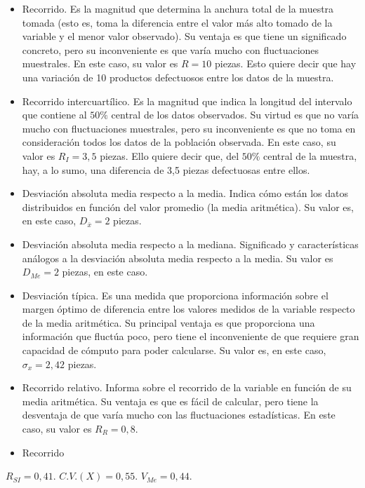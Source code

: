 \begin{itemize}
	
	\item Recorrido. Es la magnitud que determina la anchura total de la muestra tomada (esto es, toma la diferencia entre el valor más alto tomado de la variable y el menor valor observado). Su ventaja es que tiene un significado concreto, pero su inconveniente es que varía mucho con fluctuaciones muestrales. En este caso, su valor es $R = 10$ piezas. Esto quiere decir que hay una variación de 10 productos defectuosos entre los datos de la muestra.
	
	\item Recorrido intercuartílico. Es la magnitud que indica la longitud del intervalo que contiene al $50\%$ central de los datos observados. Su virtud es que no varía mucho con fluctuaciones muestrales, pero su inconveniente es que no toma en consideración todos los datos de la población observada. En este caso, su valor es $R_{I} = 3,5$ piezas. Ello quiere decir que, del $50\%$ central de la muestra, hay, a lo sumo, una diferencia de 3,5 piezas defectuosas entre ellos.
	
	\item Desviación absoluta media respecto a la media. Indica cómo están los datos distribuidos en función del valor promedio (la media aritmética). Su valor es, en este caso, $D_{\bar x} = 2$ piezas.
	
	\item Desviación absoluta media respecto a la mediana. Significado y características análogos a la desviación absoluta media respecto a la media. Su valor es $D_{Me} = 2$ piezas, en este caso.
	
	\item Desviación típica. Es una medida que proporciona información sobre el margen óptimo de diferencia entre los valores medidos de la variable respecto de la media aritmética. Su principal ventaja es que proporciona una información que fluctúa poco, pero tiene el inconveniente de que requiere gran capacidad de cómputo para poder calcularse. Su valor es, en este caso, $\sigma_{x} = 2,42$ piezas.
	
	\item Recorrido relativo. Informa sobre el recorrido de la variable en función de su media aritmética. Su ventaja es que es fácil de calcular, pero tiene la desventaja de que varía mucho con las fluctuaciones estadísticas. En este caso, su valor es $R_{R} = 0,8$.
	
	\item Recorrido 
\end{itemize}




$R_{SI} = 0,41$.
$C.V.(X) = 0,55$.
$V_{Me} = 0,44$.
